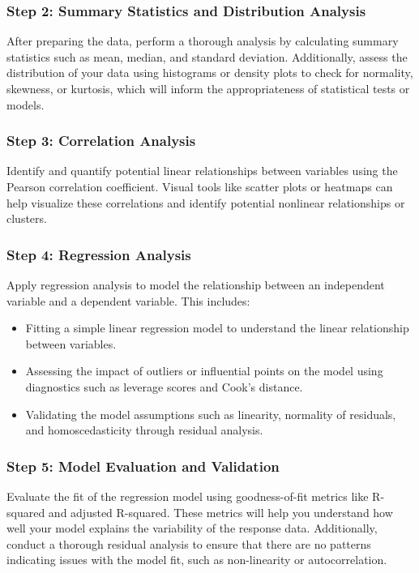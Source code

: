 \documentclass{article}
\begin{document}
\subsubsection*{Step 2: Summary Statistics and Distribution Analysis}
After preparing the data, perform a thorough analysis by calculating summary statistics such as mean, median, and standard deviation. Additionally, assess the distribution of your data using histograms or density plots to check for normality, skewness, or kurtosis, which will inform the appropriateness of statistical tests or models.

\subsubsection*{Step 3: Correlation Analysis}
Identify and quantify potential linear relationships between variables using the Pearson correlation coefficient. Visual tools like scatter plots or heatmaps can help visualize these correlations and identify potential nonlinear relationships or clusters.

\subsubsection*{Step 4: Regression Analysis}
Apply regression analysis to model the relationship between an independent variable and a dependent variable. This includes:
\begin{itemize}
    \item Fitting a simple linear regression model to understand the linear relationship between variables.
    \item Assessing the impact of outliers or influential points on the model using diagnostics such as leverage scores and Cook's distance.
    \item Validating the model assumptions such as linearity, normality of residuals, and homoscedasticity through residual analysis.
\end{itemize}

\subsubsection*{Step 5: Model Evaluation and Validation}
Evaluate the fit of the regression model using goodness-of-fit metrics like R-squared and adjusted R-squared. These metrics will help you understand how well your model explains the variability of the response data. Additionally, conduct a thorough residual analysis to ensure that there are no patterns indicating issues with the model fit, such as non-linearity or autocorrelation.
\end{document}
